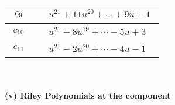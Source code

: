 \documentclass[1p]{elsarticle_modified}
\theoremstyle{definition}
\begin{document}
\begin{tabular}{m{50pt}|m{274pt}}
\hline $$\begin{aligned}c_{9}\end{aligned}$$&$\begin{aligned}
&u^{21}+11 u^{20}+\cdots+9 u+1
\end{aligned}$\\
\hline $$\begin{aligned}c_{10}\end{aligned}$$&$\begin{aligned}
&u^{21}-8 u^{19}+\cdots-5 u+3
\end{aligned}$\\
\hline $$\begin{aligned}c_{11}\end{aligned}$$&$\begin{aligned}
&u^{21}-2 u^{20}+\cdots-4 u-1
\end{aligned}$\\
\hline
\end{tabular}\\~\\
\newpage\renewcommand{\arraystretch}{1}
\flushleft \textbf{(v) Riley Polynomials at the component}\newline \\
\end{document}
